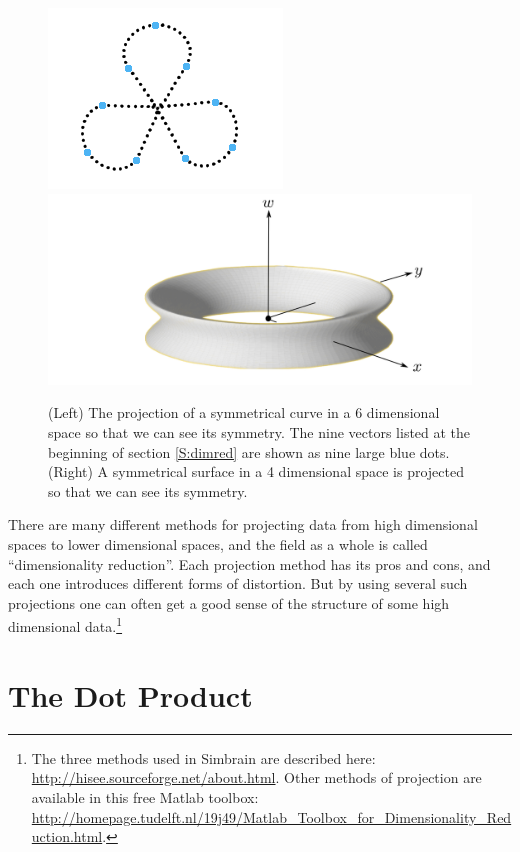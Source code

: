 \begin{figure}[h]
\centering
\includegraphics[scale=2.7]{./images/Sammon3.png}
\includegraphics[scale=0.22]{./images/torus.png}
\caption[Scott Hotton.]{(Left) The projection of a symmetrical curve in a 6 dimensional space 
so that we can see its symmetry. The nine vectors listed at the beginning of 
section \ref{S:dimred} are shown as nine large blue dots. (Right) A 
symmetrical surface in a 4 dimensional space is projected so that we can see 
its symmetry.}
\label{F:projection}
\end{figure}

There are many different methods for projecting data from high dimensional spaces to lower dimensional spaces, and the field as a whole is called ``dimensionality reduction''. Each projection method has its pros and cons, and each one introduces different forms of distortion. But by using several such projections one can often get a good sense of the structure of some high dimensional data.\footnote{The three methods used in Simbrain are described here: \url{http://hisee.sourceforge.net/about.html}. Other methods of projection are available in this free Matlab toolbox: \url{http://homepage.tudelft.nl/19j49/Matlab_Toolbox_for_Dimensionality_Reduction.html}.}

\section{The Dot Product}

